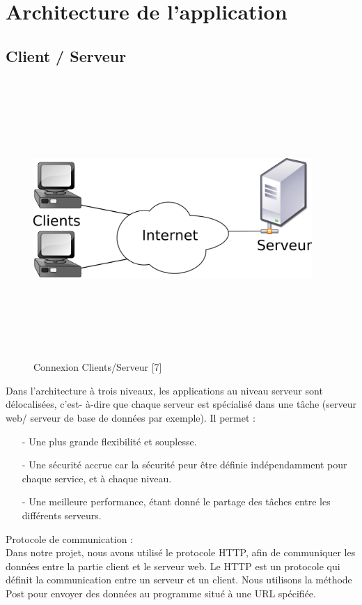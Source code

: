 \documentclass[11.5pt]{report}
\begin{document}
\section{Architecture de l’application }
\subsection{Client / Serveur }
\begin{figure}[h]
	
	\begin{center}
		\includegraphics[width=300pt,height=300pt]{clientserveur.png} 
		\caption{Connexion Clients/Serveur [7]}
	\end{center}
	
\end{figure}
\newpage
Dans l’architecture à trois niveaux, les applications au niveau serveur sont délocalisées, c’est- à-dire que chaque serveur est spécialisé dans une tâche (serveur web/ serveur de base de données par exemple).
Il permet :\\
\begin{itemize}
	\item [-] Une plus grande flexibilité et souplesse. 
	\item [-] Une sécurité accrue car la sécurité peur être définie indépendamment pour chaque service, et à chaque niveau. 
	\item [-] Une meilleure performance, étant donné le partage des tâches entre les différents serveurs.\\
\end{itemize}
Protocole de communication :\\
Dans notre projet, nous avons utilisé le protocole HTTP, afin de communiquer les données entre la partie client et le serveur web. Le HTTP est un protocole qui définit la communication entre un serveur et un client. Nous utilisons la méthode Post pour envoyer des données au programme situé à une URL spécifiée.
\end{document}
